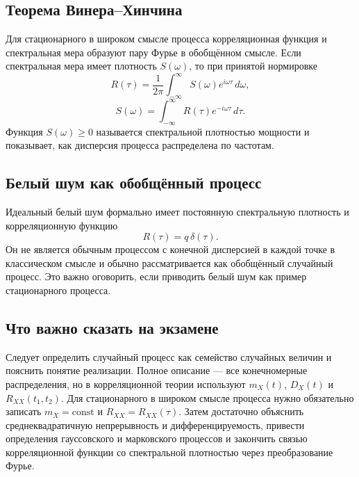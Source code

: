 \subsection{Теорема Винера--Хинчина}

Для стационарного в широком смысле процесса корреляционная функция и спектральная
мера образуют пару Фурье в обобщённом смысле. Если спектральная мера имеет плотность
$S(\omega)$, то при принятой нормировке
\[
    R(\tau)=\frac{1}{2\pi}\int_{-\infty}^{\infty}
    S(\omega)e^{i\omega\tau}\,d\omega,
\]
\[
    S(\omega)=\int_{-\infty}^{\infty}
    R(\tau)e^{-i\omega\tau}\,d\tau.
\]
Функция $S(\omega)\ge0$ называется спектральной плотностью мощности и показывает,
как дисперсия процесса распределена по частотам.

\subsection{Белый шум как обобщённый процесс}

Идеальный белый шум формально имеет постоянную спектральную плотность и
корреляционную функцию
\[
    R(\tau)=q\,\delta(\tau).
\]
Он не является обычным процессом с конечной дисперсией в каждой точке в классическом
смысле и обычно рассматривается как обобщённый случайный процесс. Это важно
оговорить, если приводить белый шум как пример стационарного процесса.

\subsection{Что важно сказать на экзамене}

Следует определить случайный процесс как семейство случайных величин и пояснить
понятие реализации. Полное описание --- все конечномерные распределения, но в
корреляционной теории используют $m_X(t)$, $D_X(t)$ и
$R_{XX}(t_1,t_2)$. Для стационарного в широком смысле процесса нужно обязательно
записать $m_X=\mathrm{const}$ и $R_{XX}=R_{XX}(\tau)$. Затем достаточно
объяснить среднеквадратичную непрерывность и дифференцируемость, привести
определения гауссовского и марковского процессов и закончить связью
корреляционной функции со спектральной плотностью через преобразование Фурье.

\newpage
